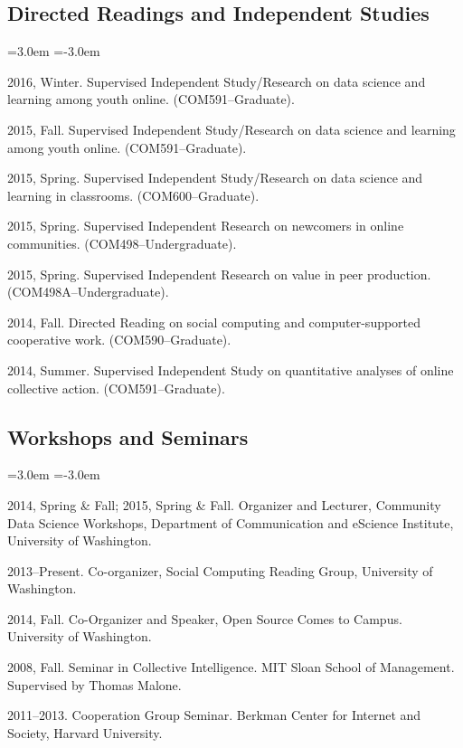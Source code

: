 \documentclass[10pt]{article}
\newenvironment{cvlist}{
\begin{list}{}{\leftmargin=3.0em \itemindent=-3.0em}
  \setlength{\itemsep}{0pt}
  \setlength{\parskip}{0em}
  \setlength{\parsep}{1em}
  \setlength{\parindent}{0em}}
{\vspace{1em}
\end{list}}
\begin{document}
\subsection{Directed Readings and Independent Studies}
\begin{cvlist}
\item 2016, Winter. Supervised Independent Study/Research on data science and learning among youth online. (COM591--Graduate). %
\item 2015, Fall. Supervised Independent Study/Research on data science and learning among youth online. (COM591--Graduate). %
\item 2015, Spring. Supervised Independent Study/Research on data science and learning in classrooms. (COM600--Graduate). %
\item 2015, Spring. Supervised Independent Research on newcomers in online communities. (COM498--Undergraduate). %
\item 2015, Spring. Supervised Independent Research on value in peer production. (COM498A--Undergraduate). %
\item 2014, Fall. Directed Reading on social computing and computer-supported cooperative work. (COM590--Graduate).%
\item 2014, Summer. Supervised Independent Study on quantitative analyses of online collective action. (COM591--Graduate).  %
\end{cvlist}

\subsection{Workshops and Seminars}
\begin{cvlist}
\item 2014, Spring \& Fall; 2015, Spring \& Fall. Organizer and Lecturer, Community Data Science Workshops, Department of Communication and eScience Institute, University of Washington.
\item 2013--Present. Co-organizer, Social Computing Reading Group, University of Washington.
\item 2014, Fall. Co-Organizer and Speaker, Open Source Comes to Campus. University of Washington.
\item 2008, Fall. Seminar in Collective Intelligence. MIT Sloan School of Management. Supervised by Thomas Malone.
\item 2011--2013. Cooperation Group Seminar. Berkman Center for Internet and Society, Harvard University.
\end{cvlist}
\end{document}
